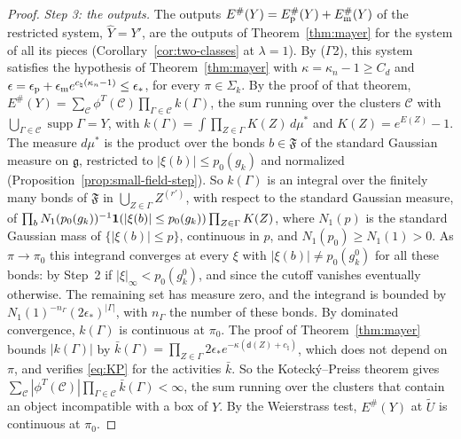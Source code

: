 \begin{proof}
\emph{Step 3: the outputs.} The outputs $E^\#(Y)=E^\#_{\rm p}(Y)+E^\#_{\rm m}(Y)$ of the restricted system, $\hat Y=Y'$, are the outputs of Theorem~\ref{thm:mayer} for the system of all its pieces (Corollary~\ref{cor:two-classes} at $\lambda=1$). By ($\Gamma$2), this system satisfies the hypothesis of Theorem~\ref{thm:mayer} with $\kappa=\kappa_n-1\ge C_d$ and $\epsilon=\epsilon_{\rm p}+\epsilon_{\rm m}e^{c_\natural(\kappa_n-1)}\le\epsilon_*$, for every $\pi\in\Sigma_k$. By the proof of that theorem, $E^\#(Y)=\sum_{\mathcal C}\phi^T(\mathcal C)\prod_{\Gamma\in\mathcal C}k(\Gamma)$, the sum running over the clusters $\mathcal C$ with $\bigcup_{\Gamma\in\mathcal C}\operatorname{supp}\Gamma=Y$, with $k(\Gamma)=\int\prod_{Z\in\Gamma}K(Z)\,d\mu^*$ and $K(Z)=e^{E(Z)}-1$. The measure $d\mu^*$ is the product over the bonds $b\in\mathfrak F$ of the standard Gaussian measure on $\mathfrak g$, restricted to $|\xi(b)|\le p_0(g_k)$ and normalized (Proposition~\ref{prop:small-field-step}). So $k(\Gamma)$ is an integral over the finitely many bonds of $\mathfrak F$ in $\bigcup_{Z\in\Gamma}Z^{(r')}$, with respect to the standard Gaussian measure, of $\prod_bN_1(p_0(g_k))^{-1}\mathbf 1(|\xi(b)|\le p_0(g_k))\prod_{Z\in\Gamma}K(Z)$, where $N_1(p)$ is the standard Gaussian mass of $\{|\xi(b)|\le p\}$, continuous in $p$, and $N_1(p_0)\ge N_1(1)>0$. As $\pi\to\pi_0$ this integrand converges at every $\xi$ with $|\xi(b)|\ne p_0(g^0_k)$ for all these bonds: by Step~2 if $|\xi|_\infty<p_0(g^0_k)$, and since the cutoff vanishes eventually otherwise. The remaining set has measure zero, and the integrand is bounded by $N_1(1)^{-n_\Gamma}(2\epsilon_*)^{|\Gamma|}$, with $n_\Gamma$ the number of these bonds. By dominated convergence, $k(\Gamma)$ is continuous at $\pi_0$. The proof of Theorem~\ref{thm:mayer} bounds $|k(\Gamma)|$ by $\bar k(\Gamma)=\prod_{Z\in\Gamma}2\epsilon_*e^{-\kappa(\mathsf d(Z)+c_\natural)}$, which does not depend on $\pi$, and verifies \eqref{eq:KP} for the activities $\bar k$. So the Koteck\'y--Preiss theorem gives $\sum_{\mathcal C}|\phi^T(\mathcal C)|\prod_{\Gamma\in\mathcal C}\bar k(\Gamma)<\infty$, the sum running over the clusters that contain an object incompatible with a box of $Y$. By the Weierstrass test, $E^\#(Y)$ at $\tilde U$ is continuous at $\pi_0$.


\end{proof}
